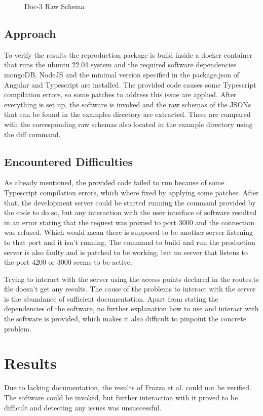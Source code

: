 \documentclass[sigconf, nonacm]{acmart}
\begin{document}
\begin{figure}[t]
	\centering
	\caption{Doc-3 Raw Schema}
	\label{fig:schema3}
	
\end{figure}

\subsection{Approach}
\label{sec:approach}
To verify the results the reproduction package is build inside a docker container that runs the ubuntu 22.04 system and the required software dependencies mongoDB, NodeJS and the minimal version specified in the package.json of Angular and Typescript are installed. The provided code causes some Typescript compilation errors, so some patches to address this issue are applied. After everything is set up, the software is invoked and the raw schemas of the JSONs that can be found in the examples directory are extracted. These are compared with the corresponding raw schemas also located in the example directory using the diff command.
\subsection{Encountered Difficulties}
As already mentioned, the provided code failed to run because of some Typescript compilation errors, which where fixed by applying some patches. After that, the development server could be started running the command provided by the code to do so, but any interaction with the user interface of software resulted in an error stating that the request was proxied to port 3000 and the connection was refused. Which would mean there is supposed to be another server listening to that port and it isn't running. The command to build and run the production server is also faulty and is patched to be working, but no server that listens to the port 4200 or 3000 seems to be active. \par
Trying to interact with the server using the access points declared in the routes.ts file doesn't get any results. The cause of the problems to interact with the server is the abundance of sufficient documentation. Apart from stating the dependencies of the software, no further explanation how to use and interact with the software is provided, which makes it also difficult to pinpoint the concrete problem.

\section{Results}
Due to lacking documentation, the results of Frozza et al. \cite{SchemaExtraction} could not be verified. The software could be invoked, but further interaction with it proved to be difficult and detecting any issues was unsuccessful.
\end{document}
